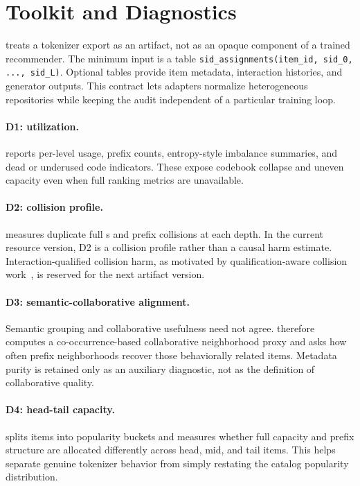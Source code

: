 \section{Toolkit and Diagnostics}

\tool treats a tokenizer export as an artifact, not as an opaque component of a
trained recommender. The minimum input is a table
\texttt{sid\_assignments(item\_id, sid\_0, ..., sid\_L)}. Optional tables
provide item metadata, interaction histories, and generator outputs. This
contract lets adapters normalize heterogeneous repositories while keeping the
audit independent of a particular training loop.

\paragraph{D1: utilization.}
\tool reports per-level usage, prefix counts, entropy-style imbalance
summaries, and dead or underused code indicators. These expose codebook
collapse and uneven capacity even when full ranking metrics are unavailable.

\paragraph{D2: collision profile.}
\tool measures duplicate full \sid{}s and prefix collisions at each depth. In
the current resource version, D2 is a collision profile rather than a causal
harm estimate. Interaction-qualified collision harm, as motivated by
qualification-aware collision work~\cite{hu2026quasid}, is reserved for the
next artifact version.

\paragraph{D3: semantic-collaborative alignment.}
Semantic grouping and collaborative usefulness need not agree. \tool therefore
computes a co-occurrence-based collaborative neighborhood proxy and asks how
often prefix neighborhoods recover those behaviorally related items. Metadata
purity is retained only as an auxiliary diagnostic, not as the definition of
collaborative quality.

\paragraph{D4: head-tail capacity.}
\tool splits items into popularity buckets and measures whether full \sid
capacity and prefix structure are allocated differently across head, mid, and
tail items. This helps separate genuine tokenizer behavior from simply
restating the catalog popularity distribution.


